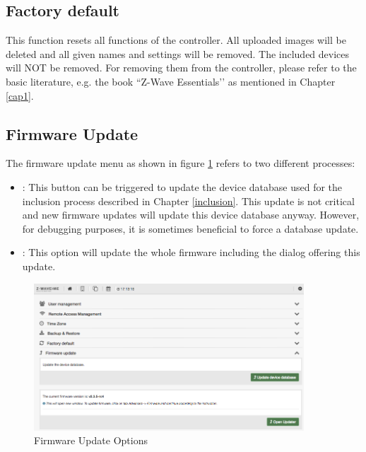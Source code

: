 \subsection{Factory default}

This function resets all functions of the controller. All uploaded images will be deleted 
and all given names and settings will be removed. The included \zwave devices will NOT be 
removed. For removing them from the controller, please refer to the basic \zwave 
literature, e.g. the book ``Z-Wave Essentials’’ as mentioned in Chapter \ref{cap1}.


\subsection{Firmware Update}

The firmware update menu as shown in figure \ref{shui76} refers to two different processes:

\begin{itemize}
\item {}: This button can be triggered to update the \zwave device 
database used for the inclusion process described in Chapter \ref{inclusion}. This 
update is not critical and new firmware updates will update this device database 
anyway. However, for debugging purposes, it is sometimes beneficial to force a database update.
\item {}: This option will update the whole firmware including the dialog 
offering this update.
\end{itemize}

\begin{figure}
\begin{center}
\includegraphics[width=0.9\textwidth]{pngs/cap4/shui76.png}
\caption{Firmware Update Options}
\label{shui76}
\end{center}
\end{figure}

